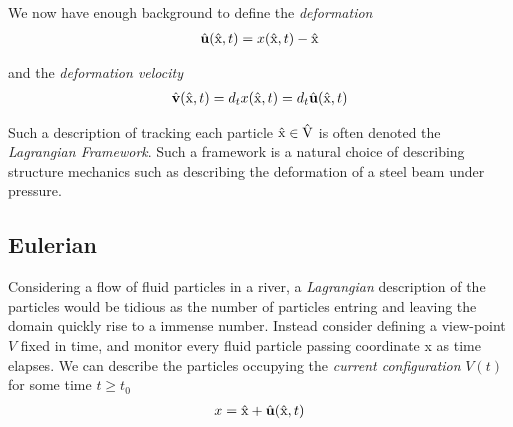 We now have enough background to define the \textit{deformation} 
\begin{align}
\hat{u}(\ha{x},t) = x(\ha{x},t) - \ha{x} 
\end{align}

and the \textit{deformation velocity}
\begin{align}
\hat{v}(\ha{x},t) = d_t x(\ha{x},t) = d_t \hat{u}(\ha{x},t) 
\end{align}

Such a description of tracking each particle $\text{\^{x}} \in \text{\^{V}}$ is often denoted the \textit{Lagrangian Framework}. Such a framework is a natural choice of describing structure mechanics such as describing
the deformation of a steel beam under pressure.  
 
\subsection*{Eulerian}
Considering a flow of fluid particles in a river, a \textit{Lagrangian} description of the particles would be tidious as the number of particles entring and leaving the domain quickly rise to a immense number. 
Instead consider defining a view-point $V$ fixed in time, and monitor every fluid particle passing coordinate x as time elapses. 
We can describe the particles occupying the \textit{current configuration} $V(t)$ for some time $t \geq t_0$ 
\begin{align*}
x = \ha{x} + \hat{u}(\ha{x}, t)	
\end{align*}